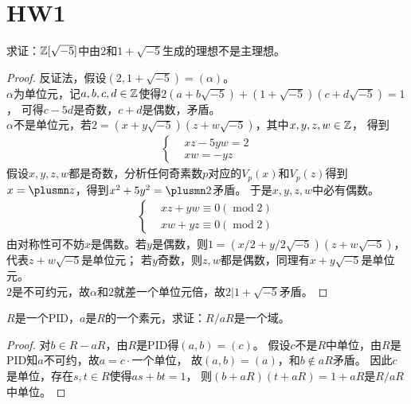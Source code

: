 \section{HW1}
\begin{exercise}
    求证：$\mathbb{Z}[\sqrt{-5}]$中由$2$和$1+\sqrt{-5}$生成的理想不是主理想。
\end{exercise}
\begin{proof}
    反证法，假设$(2,1+\sqrt{-5})=(\alpha)$。\\
    $\alpha$为单位元，记$a,b,c,d\in\mathbb{Z}$使得$2(a+b\sqrt{-5})+(1+\sqrt{-5})(c+d\sqrt{-5})=1$，
    可得$c-5d$是奇数，$c+d$是偶数，矛盾。\\
    $\alpha$不是单位元，若$2=(x+y\sqrt{-5})(z+w\sqrt{-5})$，其中$x,y,z,w\in\mathbb{Z}$，
    得到\begin{align*}
    \left\{ 
    \begin{aligned}
        &xz-5yw=2\\
        &xw=-yz
    \end{aligned}
     \right.
     \end{align*}
     假设$x,y,z,w$都是奇数，分析任何奇素数$p$对应的$V_p(x)$和$V_p(z)$得到$x=\plusmn z$，得到$x^2+5y^2=\plusmn 2$矛盾。
     于是$x,y,z,w$中必有偶数。\\
     \begin{align*}
    \left\{ 
    \begin{aligned}
        &xz+yw\equiv0(\operatorname{mod}2)\\
        &xw+yz\equiv0(\operatorname{mod}2)
    \end{aligned}
     \right.
     \end{align*}
     由对称性可不妨$x$是偶数。若$y$是偶数，则$1=(x/2+y/2\sqrt{-5})(z+w\sqrt{-5})$，代表$z+w\sqrt{-5}$是单位元；
     若$y$奇数，则$z,w$都是偶数，同理有$x+y\sqrt{-5}$是单位元。\\
     $2$是不可约元，故$\alpha$和$2$就差一个单位元倍，故$2|1+\sqrt{-5}$矛盾。
\end{proof}

\begin{exercise}
    $R$是一个PID，$a$是$R$的一个素元，求证：$R/a R$是一个域。
\end{exercise}
\begin{proof}
    对$b\in R-aR$，由$R$是PID得$(a,b)=(c)$。
    假设$c$不是$R$中单位，由$R$是PID知$a$不可约，故$a=c\cdot$一个单位，
    故$(a,b)=(a)$，和$b\notin aR$矛盾。
    因此$c$是单位，存在$s,t\in R$使得$as+bt=1$，
    则$(b+aR)(t+aR)=1+aR$是$R/aR$中单位。
\end{proof}

